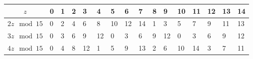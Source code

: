 \begin{table}[h!]
    \setlength{\tabcolsep}{4pt} %
    \renewcommand{\arraystretch}{1.2} %
    \centering
    \begin{tabular}{|c|p{.2cm}|p{.6cm}|p{.6cm}|p{.6cm}|p{.6cm}|p{.6cm}|p{.6cm}|p{.6cm}|p{.6cm}|p{.6cm}|p{.6cm}|p{.6cm}|p{.6cm}|p{.6cm}|p{.6cm}|}
        \hline
$z$ & 0 
& \cellcolor{OliveGreen!5}1 
& \cellcolor{OliveGreen!10}2 
& \cellcolor{OliveGreen!15}3 
& \cellcolor{OliveGreen!20}4 
& \cellcolor{OliveGreen!25}5 
& \cellcolor{OliveGreen!30}6 
& \cellcolor{OliveGreen!35}7 
& \cellcolor{OliveGreen!40}8 
& \cellcolor{OliveGreen!45}9 
& \cellcolor{OliveGreen!50}10 
& \cellcolor{OliveGreen!55}11 
& \cellcolor{OliveGreen!60}12 
& \cellcolor{OliveGreen!65}13 
& \cellcolor{OliveGreen!70}14 \\ \hline
        $2z \mod 15$ 
        & 0 
        & \cellcolor{OliveGreen!10}2 
        & \cellcolor{OliveGreen!20}4 
        & \cellcolor{OliveGreen!30}6 
        & \cellcolor{OliveGreen!40}8 
        & \cellcolor{OliveGreen!50}10 
        & \cellcolor{OliveGreen!60}12 
        & \cellcolor{OliveGreen!70}14 
        & \cellcolor{OliveGreen!5}1 
        & \cellcolor{OliveGreen!15}3 
        & \cellcolor{OliveGreen!25}5 
        & \cellcolor{OliveGreen!40}7 
        & \cellcolor{OliveGreen!45}9 
        & \cellcolor{OliveGreen!55}11 
        & \cellcolor{OliveGreen!65}13 \\ \hline
        $3z \mod 15$ 
        & 0 
        & \cellcolor{OliveGreen!15}3 
        & \cellcolor{OliveGreen!30}6 
        & \cellcolor{OliveGreen!45}9 
        & \cellcolor{OliveGreen!60}12 
        & 0 
        & \cellcolor{OliveGreen!15}3 
        & \cellcolor{OliveGreen!30}6 
        & \cellcolor{OliveGreen!45}9 
        & \cellcolor{OliveGreen!60}12 
        & 0 
        & \cellcolor{OliveGreen!15}3 
        & \cellcolor{OliveGreen!30}6 
        & \cellcolor{OliveGreen!45}9 
        & \cellcolor{OliveGreen!60}12 \\ \hline
        $4z \mod 15$ 
        & 0 
        & \cellcolor{OliveGreen!20}4 
        & \cellcolor{OliveGreen!40}8 
        & \cellcolor{OliveGreen!60}12 
        & \cellcolor{OliveGreen!5}1 
        & \cellcolor{OliveGreen!25}5 
        & \cellcolor{OliveGreen!45}9 
        & \cellcolor{OliveGreen!65}13 
        & \cellcolor{OliveGreen!10}2 
        & \cellcolor{OliveGreen!30}6 
        & \cellcolor{OliveGreen!50}10 
        & \cellcolor{OliveGreen!70}14 
        & \cellcolor{OliveGreen!15}3 
        & \cellcolor{OliveGreen!40}7 
        & \cellcolor{OliveGreen!55}11 \\ \hline

\end{tabular}
\end{table}
